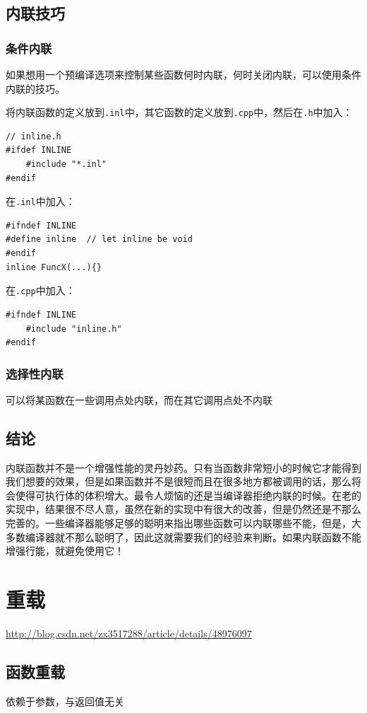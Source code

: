 \documentclass[UTF8,a4paper,12pt]{ctexbook} %
\begin{document}
    \section{内联技巧}
	    \subsection{条件内联}
		    如果想用一个预编译选项来控制某些函数何时内联，何时关闭内联，可以使用条件内联的技巧。
		    
		    将内联函数的定义放到\verb|.inl|中，其它函数的定义放到\verb|.cpp|中，然后在\verb|.h|中加入：
		    \begin{lstlisting}
// inline.h
#ifdef INLINE
	#include "*.inl"
#endif
		    \end{lstlisting}
		    
		    在\verb|.inl|中加入：
		    \begin{lstlisting}
#ifndef INLINE
#define inline  // let inline be void
#endif
inline FuncX(...){}
		    \end{lstlisting}
		    
			 在\verb|.cpp|中加入：   
			 \begin{lstlisting}
#ifndef INLINE
	#include "inline.h"
#endif
			 \end{lstlisting}
		    
	    \subsection{选择性内联}
	      可以将某函数在一些调用点处内联，而在其它调用点处不内联
    \section{结论}
       内联函数并不是一个增强性能的灵丹妙药。只有当函数非常短小的时候它才能得到我们想要的效果，但是如果函数并不是很短而且在很多地方都被调用的话，那么将会使得可执行体的体积增大。最令人烦恼的还是当编译器拒绝内联的时候。在老的实现中，结果很不尽人意，虽然在新的实现中有很大的改善，但是仍然还是不那么完善的。一些编译器能够足够的聪明来指出哪些函数可以内联哪些不能，但是，大多数编译器就不那么聪明了，因此这就需要我们的经验来判断。如果内联函数不能增强行能，就避免使用它！
       
       
\chapter{重载}
	\url{http://blog.csdn.net/zx3517288/article/details/48976097}
    \section{函数重载}依赖于参数，与返回值无关
       
\end{document}
